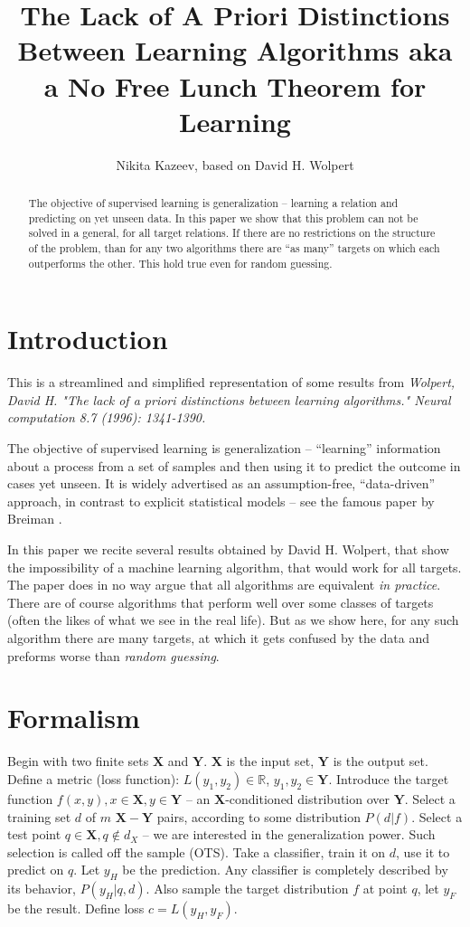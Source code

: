 \documentclass[a4paper]{article}
\title{The Lack of A Priori Distinctions Between Learning Algorithms aka
a No Free Lunch Theorem for Learning}
\author{Nikita Kazeev, based on David H. Wolpert}
\begin{document}
\maketitle
\begin{abstract}
  The objective of supervised learning is generalization -- learning a
  relation and predicting on yet unseen data. In this paper we show
  that this problem can not be solved in a general, for all target
  relations. If there are no restrictions on the structure of the
  problem, than for any two algorithms there are ``as many'' targets
  on which each outperforms the other. This hold true even for random
  guessing.
\end{abstract}

\section{Introduction}
This is a streamlined and simplified representation of some results
from \textit{Wolpert, David H. "The lack of a priori distinctions between
learning algorithms." Neural computation 8.7 (1996): 1341-1390.}

The objective of supervised learning is generalization -- ``learning''
information about a process from a set of samples and then using it to
predict the outcome in cases yet unseen. It is widely advertised as an
assumption-free, ``data-driven'' approach, in contrast to explicit
statistical models -- see the famous paper by Breiman \cite{breiman}.

In this paper we recite several results obtained by David H. Wolpert,
that show the impossibility of a machine learning algorithm, that
would work for all targets. The paper does in no way argue that all
algorithms are equivalent \textit{in practice}. There are of course
algorithms that perform well over some classes of targets (often the
likes of what we see in the real life). But as we show here, for any
such algorithm there are many targets, at which it gets confused by
the data and preforms worse than \textit{random guessing}.

\section{Formalism}
Begin with two finite sets $\mathbf{X}$ and $\mathbf{Y}$. $\mathbf{X}$
is the input set, $\mathbf{Y}$ is the output set. Define a metric
(loss function): $L(y_1, y_2) \in \mathbb{R}$,
$y_1, y_2 \in \mathbf{Y}$. Introduce the target function
$f(x, y), x \in \mathbf{X}, y \in \mathbf{Y}$ -- an
$\mathbf{X}$-conditioned distribution over $\mathbf{Y}$. Select a
training set $d$ of $m$ $\mathbf{X}-\mathbf{Y}$ pairs, according to
some distribution $P(d|f)$. Select a test point
$q\in \mathbf{X}, q \notin d_X$ -- we are interested in the
generalization power. Such selection is called off the sample
(OTS). Take a classifier, train it on $d$, use it to predict on
$q$. Let $y_H$ be the prediction. Any classifier is completely
described by its behavior, $P(y_H|q,d)$. Also sample the target
distribution $f$ at point $q$, let $y_F$ be the result. Define loss
$c = L(y_H, y_F)$.
\end{document}
